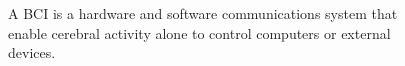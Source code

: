 \begin{figure}
\begin{centering}

\par\end{centering}
\caption{A \gls{BCI} is a hardware and software communications
system that enable cerebral activity alone to control computers or
external devices.}
\label{fig:bci_system}
\end{figure}